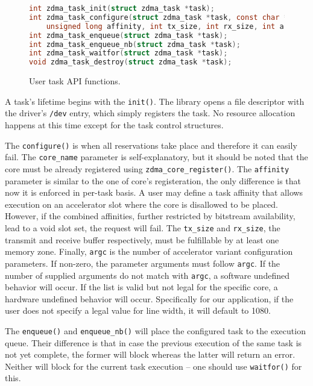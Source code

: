 \begin{figure}[H]
\centering
\begin{lstlisting}[style=basic,language=C]
int zdma_task_init(struct zdma_task *task);
int zdma_task_configure(struct zdma_task *task, const char *core_name,
	unsigned long affinity, int tx_size, int rx_size, int argc, ...);
int zdma_task_enqueue(struct zdma_task *task);
int zdma_task_enqueue_nb(struct zdma_task *task);
int zdma_task_waitfor(struct zdma_task *task);
void zdma_task_destroy(struct zdma_task *task);
\end{lstlisting}
\caption{User task API functions.}
\label{lst:api-user}
\end{figure}

A task's lifetime begins with the \texttt{init()}. The library opens
a file descriptor with the driver's \texttt{/dev} entry, which
simply registers the task. No resource allocation happens at this time
except for the task control structures.

The \texttt{configure()} is when all reservations take place and therefore
it can easily fail. The \texttt{core\_name} parameter is self-explanatory,
but it should be noted that the core must be already registered using
\texttt{zdma\_core\_register()}. The \texttt{affinity} parameter is
similar to the one of core's registeration, the only difference is
that now it is enforced in per-task basis. A user may define a
task affinity that allows execution on an accelerator slot where
the core is disallowed to be placed. However, if the combined affinities,
further restricted by bitstream availability, lead to a void slot set,
the request will fail. The \texttt{tx\_size} and \texttt{rx\_size},
the transmit and receive buffer respectively, must be fulfillable by at least
one memory zone. Finally, \texttt{argc} is the number of accelerator variant 
configuration parameters. If non-zero, the parameter arguments must follow \texttt{argc}.
If the number of supplied arguments do not match with \texttt{argc},
a software undefined behavior will occur. If the list is valid but not legal
for the specific core, a hardware undefined behavior will occur. 
Specifically for our application, if the user does not specify a legal value
for line width, it will default to 1080.

The \texttt{enqueue()} and \texttt{enqueue\_nb()} will place the configured
task to the execution queue. Their difference is that in case the previous
execution of the same task is not yet complete, the former will block
whereas the latter will return an error. Neither will block for the
current task execution -- one should use \texttt{waitfor()} for this.


